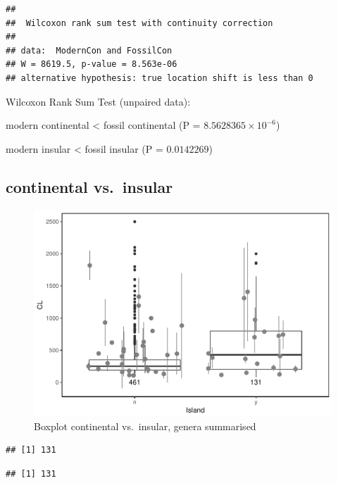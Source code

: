 \documentclass[]{article}
\begin{document}
\begin{verbatim}
## 
##  Wilcoxon rank sum test with continuity correction
## 
## data:  ModernCon and FossilCon
## W = 8619.5, p-value = 8.563e-06
## alternative hypothesis: true location shift is less than 0
\end{verbatim}

Wilcoxon Rank Sum Test (unpaired data):

modern continental \textless{} fossil continental (P =
\(8.5628365\times 10^{-6}\))

modern insular \textless{} fossil insular (P = \(0.0142269\))

\newpage

\subsection{continental vs.~insular}\label{continental-vs.insular-1}

\begin{figure}[htbp]
\centering
\includegraphics{MA_JJ_files/figure-latex/Boxplot continental vs. insular-1.pdf}
\caption{Boxplot continental vs.~insular, genera summarised}
\end{figure}

\begin{verbatim}
## [1] 131
\end{verbatim}

\begin{verbatim}
## [1] 131
\end{verbatim}
\end{document}
